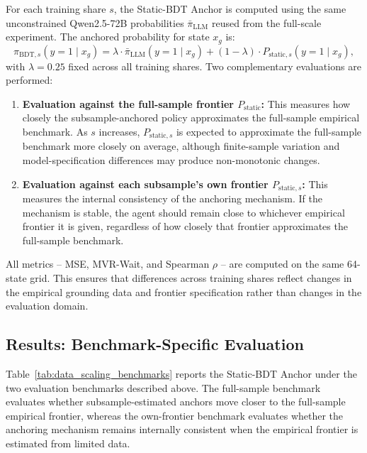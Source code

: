 \documentclass[11pt]{article}
\begin{document}
For each training share \(s\), the Static-BDT Anchor is computed using the same unconstrained Qwen2.5-72B probabilities \(\bar{\pi}_{\mathrm{LLM}}\) reused from the full-scale experiment. The anchored probability for state \(x_g\) is:
\[
\pi_{\mathrm{BDT},s}(y=1 \mid x_g)
=
\lambda \cdot \bar{\pi}_{\mathrm{LLM}}(y=1 \mid x_g)
+
(1-\lambda) \cdot P_{\mathrm{static},s}(y=1 \mid x_g),
\]
with \(\lambda = 0.25\) fixed across all training shares. Two complementary evaluations are performed:

\begin{enumerate}
    \item \textbf{Evaluation against the full-sample frontier \(P_{\mathrm{static}}\):} This measures how closely the subsample-anchored policy approximates the full-sample empirical benchmark. As \(s\) increases, \(P_{\mathrm{static},s}\) is expected to approximate the full-sample benchmark more closely on average, although finite-sample variation and model-specification differences may produce non-monotonic changes.

    \item \textbf{Evaluation against each subsample's own frontier \(P_{\mathrm{static},s}\):} This measures the internal consistency of the anchoring mechanism. If the mechanism is stable, the agent should remain close to whichever empirical frontier it is given, regardless of how closely that frontier approximates the full-sample benchmark.
\end{enumerate}

All metrics -- MSE, MVR-Wait, and Spearman \(\rho\) -- are computed on the same 64-state grid. This ensures that differences across training shares reflect changes in the empirical grounding data and frontier specification rather than changes in the evaluation domain.
\subsection{Results: Benchmark-Specific Evaluation}
\label{app:results_vs_full}

Table~\ref{tab:data_scaling_benchmarks} reports the Static-BDT Anchor under the two evaluation benchmarks described above. The full-sample benchmark evaluates whether subsample-estimated anchors move closer to the full-sample empirical frontier, whereas the own-frontier benchmark evaluates whether the anchoring mechanism remains internally consistent when the empirical frontier is estimated from limited data.
\end{document}
